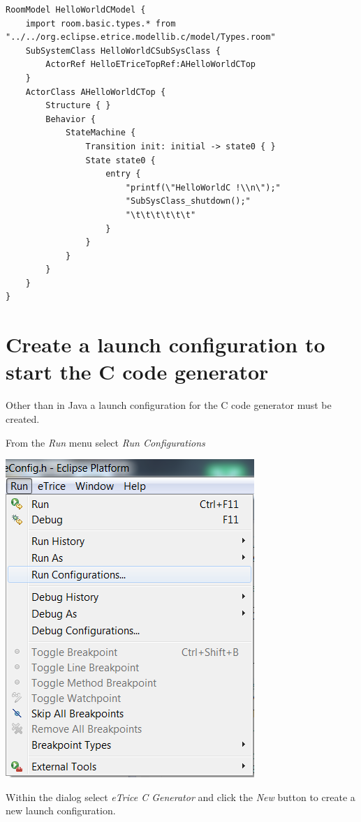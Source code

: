 \begin{verbatim} 
RoomModel HelloWorldCModel {
	import room.basic.types.* from "../../org.eclipse.etrice.modellib.c/model/Types.room"
	SubSystemClass HelloWorldCSubSysClass {
		ActorRef HelloETriceTopRef:AHelloWorldCTop 
	}
	ActorClass AHelloWorldCTop {
		Structure { }
		Behavior {
			StateMachine {
				Transition init: initial -> state0 { }
				State state0 {
					entry {
						"printf(\"HelloWorldC !\\n\");"
						"SubSysClass_shutdown();"
						"\t\t\t\t\t\t"
					}
				}
			}
		}
	}	
}
\end{verbatim}

\section{Create a launch configuration to start the C code generator}

Other than in Java a launch configuration for the C code generator must be created.

From the \textit{Run} menu select \textit{Run Configurations}

\includegraphics{images/034-HelloWorldC06.png}

Within the dialog select \textit{eTrice C Generator} and click the \textit{New} button to create a new 
launch configuration.

